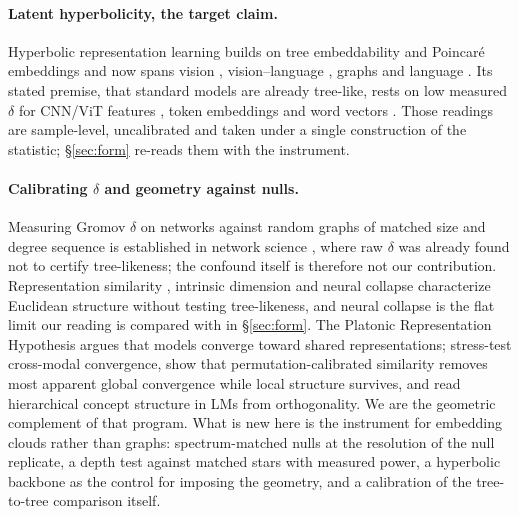 \paragraph{Latent hyperbolicity, the target claim.} Hyperbolic representation learning builds on tree embeddability \citep{sarkar2011low} and Poincar\'{e} embeddings \citep{nickel2017poincare, ganea2018hyperbolic} and now spans vision \citep{Khrulkov_2020_CVPR, ermolov2022hyperbolic, atigh2022hyperbolic, bdeir2024fully}, vision--language \citep{desai2023meru, pal2025compositional}, graphs \citep{chami2019hyperbolic} and language \citep{chen2022fully, he2026helm, sinha2024learning}. Its stated premise, that standard models are already tree-like, rests on low measured $\delta$ for CNN/ViT features \citep{Khrulkov_2020_CVPR, bdeir2024fully}, token embeddings \citep{yang2025hyperbolic} and word vectors \citep{tifrea2019poincare}. Those readings are sample-level, uncalibrated and taken under a single construction of the statistic; \S\ref{sec:form} re-reads them with the instrument.

\paragraph{Calibrating $\delta$ and geometry against nulls.} Measuring Gromov $\delta$ on networks against random graphs of matched size and degree sequence is established in network science \citep{narayan2011curvature, kennedy2013hyperbolicity, adcock2013treelike}, where raw $\delta$ was already found not to certify tree-likeness; the confound itself is therefore not our contribution. Representation similarity \citep{kornblith2019cka}, intrinsic dimension \citep{ansuini2019intrinsic, pope2021intrinsic} and neural collapse \citep{papyan2020prevalence} characterize Euclidean structure without testing tree-likeness, and neural collapse is the flat limit our reading is compared with in \S\ref{sec:form}. The Platonic Representation Hypothesis \citep{huh2024platonic} argues that models converge toward shared representations; \citet{koepke2026cave} stress-test cross-modal convergence, \citet{groger2026aristotelian} show that permutation-calibrated similarity removes most apparent global convergence while local structure survives, and \citet{park2024geometry} read hierarchical concept structure in LMs from orthogonality. We are the geometric complement of that program. What is new here is the instrument for embedding clouds rather than graphs: spectrum-matched nulls at the resolution of the null replicate, a depth test against matched stars with measured power, a hyperbolic backbone as the control for imposing the geometry, and a calibration of the tree-to-tree comparison itself.

